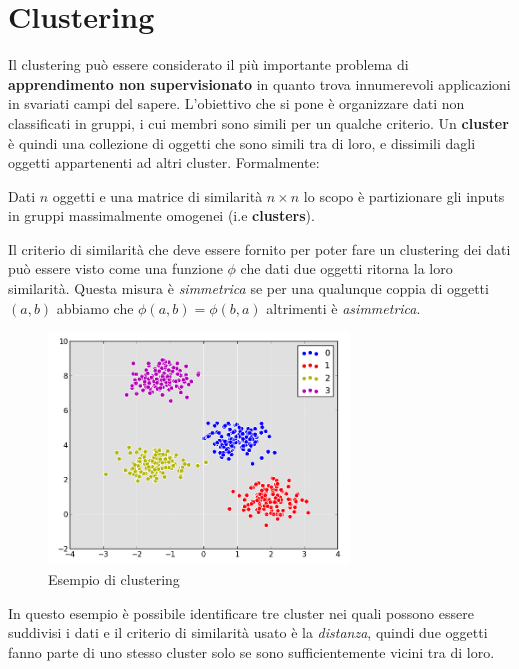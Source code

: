 
\chapter{Clustering} %
\label{cha:clustering}

Il clustering può essere considerato il più importante problema di \textbf{apprendimento non supervisionato} in quanto trova innumerevoli applicazioni in svariati campi del sapere. L’obiettivo che si pone è organizzare dati non classificati in gruppi, i cui membri sono simili per un qualche criterio. Un \textbf{cluster} è quindi una collezione di oggetti che sono simili tra di loro, e dissimili dagli oggetti appartenenti ad altri cluster. Formalmente:

\begin{mydef}
	Dati $n$ oggetti e una matrice di similarità $n \times n$ lo scopo è partizionare gli inputs in gruppi massimalmente omogenei (i.e \textbf{clusters}).
\end{mydef}

Il criterio di similarità che deve essere fornito per poter fare un clustering dei dati può essere visto come una funzione $\phi$ che dati due oggetti ritorna la loro similarità. Questa misura è \emph{simmetrica} se per una qualunque coppia di oggetti $(a, b)$ abbiamo che $\phi(a, b) = \phi(b, a)$ altrimenti è \emph{asimmetrica}.\\

\begin{figure}[h!]
	\centering
	\includegraphics[width=8cm]{images/clustering.png}
	\caption{Esempio di clustering}\label{fig:clusters}
\end{figure}

In questo esempio è possibile identificare tre cluster nei quali possono essere suddivisi i dati e il criterio di similarità usato è la \emph{distanza}, quindi due oggetti fanno parte di uno stesso cluster solo se sono sufficientemente vicini tra di loro. 

